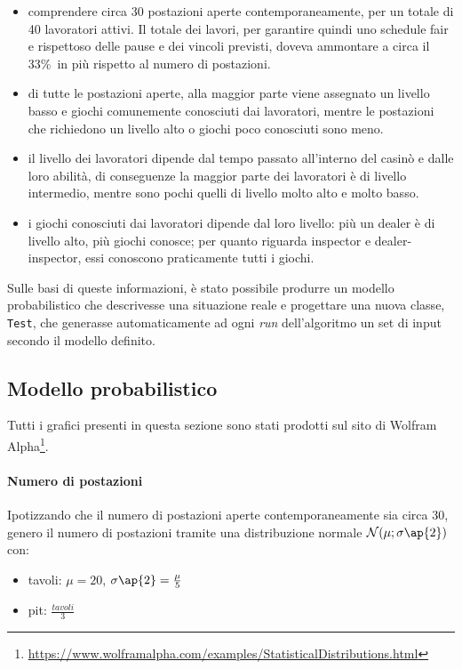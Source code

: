 \begin{itemize}
    \item comprendere circa 30 postazioni aperte contemporaneamente, per un totale di 40 lavoratori attivi. Il totale dei lavori, per garantire quindi uno schedule fair e rispettoso delle pause e dei vincoli previsti, doveva ammontare a circa il 33\%\ in più rispetto al numero di postazioni.
    \item di tutte le postazioni aperte, alla maggior parte viene assegnato un livello basso e giochi comunemente conosciuti dai lavoratori, mentre le postazioni che richiedono un livello alto o giochi poco conosciuti sono meno.
    \item il livello dei lavoratori dipende dal tempo passato all'interno del casinò e dalle loro abilità, di conseguenze la maggior parte dei lavoratori è di livello intermedio, mentre sono pochi quelli di livello molto alto e molto basso.
    \item i giochi conosciuti dai lavoratori dipende dal loro livello: più un dealer è di livello alto, più giochi conosce; per quanto riguarda inspector e dealer-inspector, essi conoscono praticamente tutti i giochi.
\end{itemize}
Sulle basi di queste informazioni, è stato possibile produrre un modello probabilistico che descrivesse una situazione reale e progettare una nuova classe, \texttt{Test}, che generasse automaticamente ad ogni \textit{run} dell'algoritmo un set di input secondo il modello definito.

\subsection{Modello probabilistico}

Tutti i grafici presenti in questa sezione sono stati prodotti sul sito di Wolfram Alpha\footnote{{\color{blue} \url{https://www.wolframalpha.com/examples/StatisticalDistributions.html}}}.
    \paragraph{Numero di postazioni} Ipotizzando che il numero di postazioni aperte contemporaneamente sia circa 30, genero il numero di postazioni tramite una distribuzione normale $\mathcal{N}(\mu;\sigma \ap{2})$ con:
    \begin{itemize}
        \item tavoli: $\mu = 20$, $\sigma \ap{2} = \frac{\mu}{5}$
        \item pit: $\frac{tavoli}{3}$
    \end{itemize}

